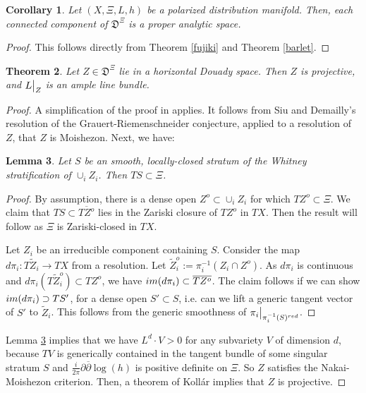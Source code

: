 \documentclass[10pt,letterpaper,english,reqno]{amsart}
\numberwithin{equation}{subsection}
\newcommand\fD{{\mathfrak D}}
\newcommand\wZ{{\widetilde Z}}
\newtheorem{theorem}{Theorem}[section]
\newtheorem{corollary}[theorem]{Corollary}
\newtheorem{lemma}[theorem]{Lemma}
\theoremstyle{definition}
\begin{document}
\begin{corollary} Let $(X,\Xi,L,h)$ be a polarized distribution
manifold. Then, each connected component of $\fD^{\Xi}$ is a proper
analytic space. \end{corollary}

\begin{proof} This follows directly from Theorem \ref{fujiki}
and Theorem \ref{barlet}. \end{proof}

\begin{theorem}\label{griffiths-algebraic}
Let $Z\in \fD^{\Xi}$ lie in a horizontal Douady space.
Then $Z$ is projective, and $L\big{|}_Z$ is an ample line bundle.
\end{theorem}

\begin{proof} 
A simplification of the
proof in \cite[Thm.~1.1]{bakker-brunebarbe-tsimerman}
applies. It follows from Siu and Demailly's resolution
\cite{siu1, siu2, demailly} of the 
Grauert-Riemenschneider conjecture, applied
to a resolution of $Z$, that $Z$ is Moishezon.
Next, we have:

\begin{lemma}\label{tan-strata}
Let $S$ be an smooth, locally-closed
stratum of the Whitney stratification
of $\cup_i Z_i$. Then $TS\subset \Xi$. \end{lemma}

\begin{proof} By assumption, there is a dense open $Z^o\subset \cup_i Z_i$
for which $TZ^o\subset \Xi$. We claim that $TS\subset \overline{TZ^o}$
lies in the Zariski closure of $TZ^o$ in $TX$. Then the result will follow 
as $\Xi$ is Zariski-closed in $TX$. 

Let $Z_i$ be an irreducible component containing $S$. Consider the map
$d\pi_i\colon T\wZ_i \to TX$ from a resolution. Let $\wZ_i^o:=\pi_i^{-1}(Z_i\cap Z^o).$ As $d\pi_i$ is continuous
and $d\pi_i(T\wZ_i^o)\subset TZ^o$, we have ${\rm im}(d\pi_i)\subset \overline{TZ^o}$.
The claim follows if we can show ${\rm im}(d\pi_i)\supset TS'$, for a dense
open $S'\subset S$, i.e. can we
lift a generic tangent vector of $S'$ to $\wZ_i$.
This follows from the generic smoothness of
$\pi_i\big{|}_{\pi_i^{-1}(S)^{\rm red}}$.
\end{proof}

Lemma \ref{tan-strata} implies that we have $L^d\cdot V>0$
for any subvariety $V$ of dimension $d$, because
$TV$ is generically contained
in the tangent bundle of some singular stratum $S$
and $\frac{i}{2\pi}\partial \overline{\partial} \log(h)$
is positive definite on $\Xi$. So $Z$ satisfies
the Nakai-Moishezon criterion. Then, a theorem of
Koll\'ar \cite[Thm.~3.11]{kollar}
implies that $Z$ is projective.
\end{proof}
\end{document}
